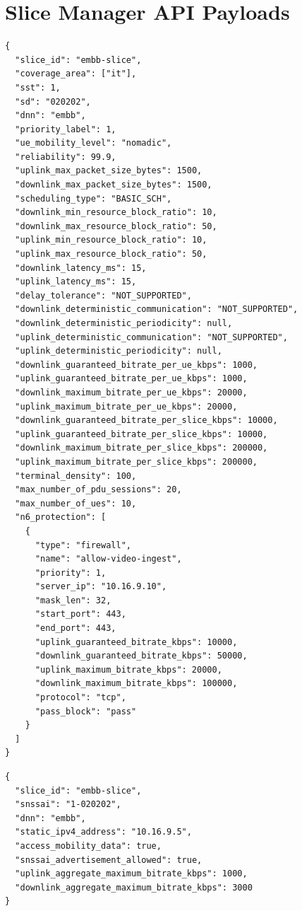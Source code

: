\clearpage
\section{Slice Manager \acs{API} Payloads}
\label{appendix:slicemanager:payloads}

\begin{listing}[H]
\begin{verbatim}
{
  "slice_id": "embb-slice",
  "coverage_area": ["it"],
  "sst": 1,
  "sd": "020202",
  "dnn": "embb",
  "priority_label": 1,
  "ue_mobility_level": "nomadic",
  "reliability": 99.9,
  "uplink_max_packet_size_bytes": 1500,
  "downlink_max_packet_size_bytes": 1500,
  "scheduling_type": "BASIC_SCH",
  "downlink_min_resource_block_ratio": 10,
  "downlink_max_resource_block_ratio": 50,
  "uplink_min_resource_block_ratio": 10,
  "uplink_max_resource_block_ratio": 50,
  "downlink_latency_ms": 15,
  "uplink_latency_ms": 15,
  "delay_tolerance": "NOT_SUPPORTED",
  "downlink_deterministic_communication": "NOT_SUPPORTED",
  "downlink_deterministic_periodicity": null,
  "uplink_deterministic_communication": "NOT_SUPPORTED",
  "uplink_deterministic_periodicity": null,
  "downlink_guaranteed_bitrate_per_ue_kbps": 1000,
  "uplink_guaranteed_bitrate_per_ue_kbps": 1000,
  "downlink_maximum_bitrate_per_ue_kbps": 20000,
  "uplink_maximum_bitrate_per_ue_kbps": 20000,
  "downlink_guaranteed_bitrate_per_slice_kbps": 10000,
  "uplink_guaranteed_bitrate_per_slice_kbps": 10000,
  "downlink_maximum_bitrate_per_slice_kbps": 200000,
  "uplink_maximum_bitrate_per_slice_kbps": 200000,
  "terminal_density": 100,
  "max_number_of_pdu_sessions": 20,
  "max_number_of_ues": 10,
  "n6_protection": [
    {
      "type": "firewall",
      "name": "allow-video-ingest",
      "priority": 1,
      "server_ip": "10.16.9.10",
      "mask_len": 32,
      "start_port": 443,
      "end_port": 443,
      "uplink_guaranteed_bitrate_kbps": 10000,
      "downlink_guaranteed_bitrate_kbps": 50000,
      "uplink_maximum_bitrate_kbps": 20000,
      "downlink_maximum_bitrate_kbps": 100000,
      "protocol": "tcp",
      "pass_block": "pass"
    }
  ]
}
\end{verbatim}
\caption{Network Slice Payload, Slice Manager \acs{API}}
\label{code:slicemanager:payloads:netslice}
\end{listing}
\clearpage

\begin{listing}[H]
\begin{verbatim}
{
  "slice_id": "embb-slice",
  "snssai": "1-020202",
  "dnn": "embb",
  "static_ipv4_address": "10.16.9.5",
  "access_mobility_data": true,
  "snssai_advertisement_allowed": true,
  "uplink_aggregate_maximum_bitrate_kbps": 1000,
  "downlink_aggregate_maximum_bitrate_kbps": 3000
}
\end{verbatim}
\caption{User Equipment Slice Association Payload, Slice Manager \acs{API}, with the \acs{IMSI} provided as \texttt{ue\_id} path parameter}
\label{code:slicemanager:payloads:ue}
\end{listing}

